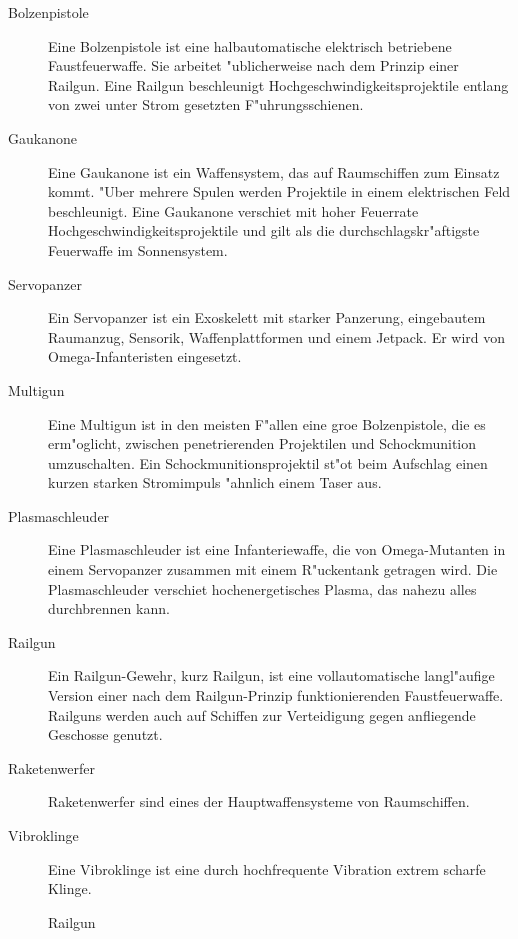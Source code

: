 \begin{description}
\item [Bolzenpistole] Eine Bolzenpistole ist eine halbautomatische elektrisch betriebene Faustfeuerwaffe. Sie arbeitet "ublicherweise nach 
      dem Prinzip einer Railgun. Eine Railgun beschleunigt Hochgeschwindigkeitsprojektile entlang von zwei unter Strom gesetzten F"uhrungsschienen.
\item [Gau\3kanone] Eine Gau\3kanone ist ein Waffensystem, das auf Raumschiffen zum Einsatz kommt. "Uber mehrere Spulen werden Projektile in 
      einem elektrischen Feld beschleunigt. Eine Gau\3kanone verschie\3t mit hoher Feuerrate Hochgeschwindigkeitsprojektile und gilt als die durchschlagskr"aftigste Feuerwaffe im Sonnensystem.
\item [Servopanzer] Ein Servopanzer ist ein Exoskelett mit starker Panzerung, eingebautem Raumanzug, Sensorik, Waffenplattformen und einem 
      Jetpack. Er wird von Omega-Infanteristen eingesetzt.
\item [Multigun] Eine Multigun ist in den meisten F"allen eine gro\3e Bolzenpistole, die es erm"oglicht, zwischen penetrierenden Projektilen 
      und Schockmunition umzuschalten. Ein Schockmunitionsprojektil st"o\3t beim Aufschlag einen kurzen starken Stromimpuls "ahnlich einem Taser aus.
\item [Plasmaschleuder] Eine Plasmaschleuder ist eine Infanteriewaffe, die von Omega-Mutanten in einem Servopanzer zusammen mit einem 
      R"uckentank getragen wird. Die Plasmaschleuder verschie\3t hochenergetisches Plasma, das nahezu alles durchbrennen kann.
\item [Railgun] Ein Railgun-Gewehr, kurz Railgun, ist eine vollautomatische langl"aufige Version einer nach dem Railgun-Prinzip      
      funktionierenden Faustfeuerwaffe. Railguns werden auch auf Schiffen zur Verteidigung gegen anfliegende Geschosse genutzt.
\item [Raketenwerfer] Raketenwerfer sind eines der Hauptwaffensysteme von Raumschiffen.
\item [Vibroklinge] Eine Vibroklinge ist eine durch hochfrequente Vibration extrem scharfe Klinge.
\end{description}

\begin{figure}[htbp]
      \centering
      \newline{}Railgun
      \label{fig:rail-gun}
\end{figure}

